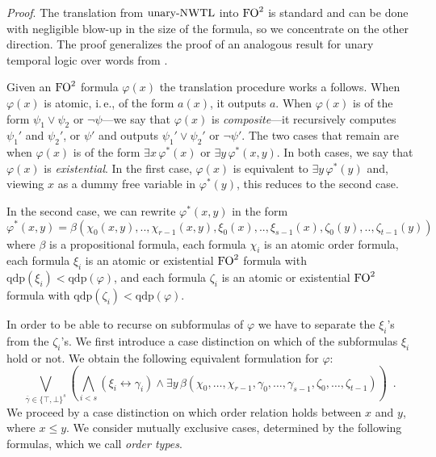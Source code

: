 \documentclass{LMCS}
\newcommand{\FO}{{\rm FO}}
\renewcommand{\phi}{\varphi}
\theoremstyle{plain}
\theoremstyle{definition}
\newcommand{\qdp}[1]{\mathrm{qdp}(#1)}
\newcommand{\ie}{i.\,e.}
\newcommand{\false}{\bot}
\newcommand{\true}{\top}
\newcommand{\ucaret}{\text{unary-}\caret}
\renewcommand{\ucaret}{\text{unary-}\nwtl}
\newcommand{\fotwo}{\FO^2}
\newcommand{\caret}{\text{CaRet}}
\begin{document}
{\em Proof}.
The translation from  $\ucaret$ into $\FO^2$ is standard and can be
done with negligible blow-up in the size of the formula, so we
concentrate on the other direction.
The proof generalizes the proof of an analogous result
 for unary temporal logic over words from \cite{EVW02}. 

Given an $\fotwo$ formula $\phi(x)$ the translation procedure works
a follows. When $\phi(x)$ is atomic, \ie, of the form $a(x)$, it
outputs $a$.  When $\phi(x)$ is of the form $\psi_1 \vee \psi_2$
or $\neg \psi$---we say that $\phi(x)$ is \emph{composite}---it
recursively computes $\psi_1'$ and $\psi_2'$, or $\psi'$ and outputs
$\psi_1' \vee \psi_2'$ or $\neg \psi'$.  The two cases that remain are
when $\phi(x)$ is of the form $\exists x\, \phi^*(x)$ or $\exists
y\, \phi^*(x,y)$. In both cases, we say that $\phi(x)$ is
\emph{existential}. In the first case, $\phi(x)$ is equivalent to
$\exists y\, \phi^*(y)$ and, viewing $x$ as a dummy free variable in
$\phi^*(y)$, this reduces to the second case.
  
In the second case, we can rewrite $\phi^*(x,y)$ in the form
\[  \phi^*(x,y)  =  \beta(\chi_0(x,y),..,\chi_{r-1}(x,y),
    \xi_0(x),..,\xi_{s-1}(x), \zeta_0(y),.., \zeta_{t-1}(y))\]
where $\beta$ is a propositional formula, each formula $\chi_i$ is an
atomic order formula, each formula $\xi_i$ is an atomic or existential
$\fotwo$ formula with $\qdp{\xi_i} < \qdp \phi$, and each formula
$\zeta_i$ is an atomic or existential $\fotwo$ formula with
$\qdp{\zeta_i} < \qdp \phi$.
  
In order to be able to recurse on subformulas of $\phi$ we have to
separate the $\xi_i$'s from the $\zeta_i$'s. We first introduce a case
distinction on which of the subformulas $\xi_i$ hold or not. We obtain
the following equivalent formulation for $\phi$:
\[  \bigvee_{\overline{\gamma} \in \{\true, \false\}^s} (
  \bigwedge_{i<s} (\xi_i \leftrightarrow \gamma_i) \wedge \exists y \,
  \beta( \chi_0, \dots, \chi_{r-1}, \gamma_0, \dots, \gamma_{s-1},
  \zeta_0, \dots, \zeta_{t-1})) \enspace. \]
We proceed by a case distinction on which order relation holds between
$x$ and $y$, where $x \leq y$. 
We consider  mutually exclusive cases, determined by
the following formulas, which we call \emph{order types}.
 
\end{document}
